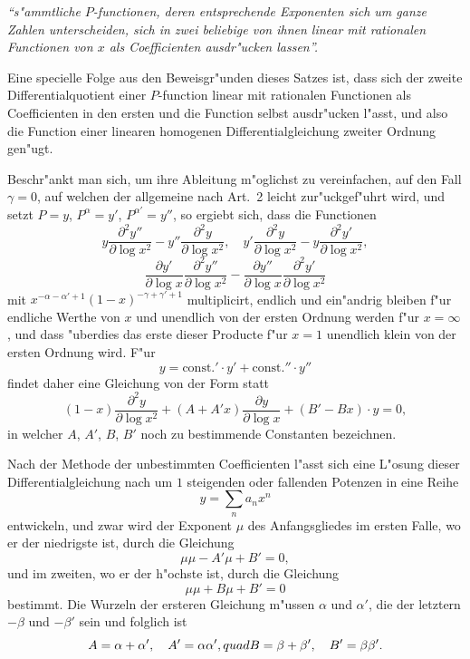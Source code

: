 \documentclass[12pt,a4paper]{article}
\begin{document}
\medskip
\textit{``s{"a}mmtliche $P$-functionen, deren entsprechende Exponenten sich um ganze Zahlen unterscheiden, sich in zwei beliebige von ihnen linear mit rationalen Functionen von $x$ als Coefficienten ausdr{"u}cken lassen''.}
\medskip

Eine specielle Folge aus den Beweisgr{"u}nden dieses Satzes ist, dass sich der zweite Differentialquotient einer $P$-function linear mit rationalen Functionen als Coefficienten in den ersten und die Function selbst ausdr{"u}cken l{"a}sst, und also die Function einer linearen homogenen Differentialgleichung zweiter Ordnung gen{"u}gt.

Beschr{"a}nkt man sich, um ihre Ableitung m{"o}glichst zu vereinfachen, auf den Fall $\gamma = 0$, auf welchen der allgemeine nach Art.~2 leicht zur{"u}ckgef{"u}hrt wird, und setzt $P = y$, $P^{\alpha} = y'$, $P^{\alpha'} = y''$, so ergiebt sich, dass die Functionen
\[
y \frac{\partial^2 y''}{\partial \log x^2} - y'' \frac{\partial^2 y}{\partial \log x^2}, \quad
y' \frac{\partial^2 y}{\partial \log x^2} - y \frac{\partial^2 y'}{\partial \log x^2},
\]
\[
\frac{\partial y'}{\partial \log x} \frac{\partial^2 y''}{\partial \log x^2} - \frac{\partial y''}{\partial \log x} \frac{\partial^2 y'}{\partial \log x^2}
\]
mit $x^{-\alpha-\alpha'+1} (1-x)^{-\gamma+\gamma'+1}$ multiplicirt, endlich und ein{"a}ndrig bleiben f{"u}r endliche Werthe von $x$ und unendlich von der ersten Ordnung werden f{"u}r $x = \infty$, und dass {"u}berdies das erste dieser Producte f{"u}r $x = 1$ unendlich klein von der ersten Ordnung wird. F{"u}r
\[
y = \text{const.}' \cdot y' + \text{const.}'' \cdot y''
\]
findet daher eine Gleichung von der Form statt
\[
(1-x) \frac{\partial^2 y}{\partial \log x^2} + (A + A'x) \frac{\partial y}{\partial \log x} + (B' - Bx) \cdot y = 0,
\]
in welcher $A$, $A'$, $B$, $B'$ noch zu bestimmende Constanten bezeichnen.

Nach der Methode der unbestimmten Coefficienten l{"a}sst sich eine L{"o}sung dieser Differentialgleichung nach um $1$ steigenden oder fallenden Potenzen in eine Reihe
\[
y = \sum_n a_n x^n
\]
entwickeln, und zwar wird der Exponent $\mu$ des Anfangsgliedes im ersten Falle, wo er der niedrigste ist, durch die Gleichung
\[
\mu\mu - A'\mu + B' = 0,
\]
und im zweiten, wo er der h{"o}chste ist, durch die Gleichung
\[
\mu\mu + B\mu + B' = 0
\]
bestimmt. Die Wurzeln der ersteren Gleichung m{"u}ssen $\alpha$ und $\alpha'$, die der letztern $-\beta$ und $-\beta'$ sein und folglich ist
\[
A = \alpha + \alpha', \quad A' = \alpha\alpha', \\quad B = \beta + \beta', \quad B' = \beta\beta'.
\]
\end{document}
